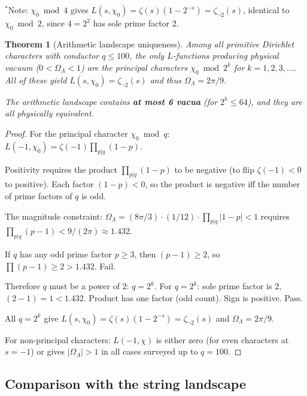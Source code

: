 \documentclass[11pt,a4paper]{article}
\newtheorem{theorem}{Theorem}
\begin{document}
$^*$Note: $\chi_0 \bmod 4$ gives $L(s,\chi_0) =
\zeta(s)(1-2^{-s}) = \zeta_{\neg 2}(s)$, identical to
$\chi_0 \bmod 2$, since $4 = 2^2$ has sole prime factor $2$.

\begin{theorem}[Arithmetic landscape uniqueness]
\label{th:unique-landscape}
Among all primitive Dirichlet characters with conductor $q \leq 100$,
the only $L$-functions producing physical vacuum
($0 < \Omega_\Lambda < 1$) are the principal characters
$\chi_0 \bmod 2^k$ for $k = 1, 2, 3, \ldots$. All of these
yield $L(s, \chi_0) = \zeta_{\neg 2}(s)$ and thus
$\Omega_\Lambda = 2\pi/9$.

The arithmetic landscape contains \textbf{at most 6 vacua}
(for $2^k \leq 64$), and they are all physically equivalent.
\end{theorem}

\begin{proof}
For the principal character $\chi_0 \bmod q$:
$L(-1, \chi_0) = \zeta(-1)\prod_{p|q}(1-p)$.

Positivity requires the product $\prod_{p|q}(1-p)$ to be
negative (to flip $\zeta(-1) < 0$ to positive). Each factor
$(1-p) < 0$, so the product is negative iff the number of
prime factors of $q$ is odd.

The magnitude constraint:
$\Omega_\Lambda = (8\pi/3) \cdot (1/12) \cdot \prod_{p|q}|1-p| < 1$
requires $\prod_{p|q}(p-1) < 9/(2\pi) \approx 1.432$.

If $q$ has any odd prime factor $p \geq 3$, then
$(p-1) \geq 2$, so $\prod(p-1) \geq 2 > 1.432$. Fail.

Therefore $q$ must be a power of $2$: $q = 2^k$.
For $q = 2^k$: sole prime factor is $2$, $(2-1) = 1 < 1.432$.
Product has one factor (odd count). Sign is positive. Pass.

All $q = 2^k$ give $L(s, \chi_0) = \zeta(s)(1-2^{-s}) =
\zeta_{\neg 2}(s)$ and $\Omega_\Lambda = 2\pi/9$.

For non-principal characters: $L(-1, \chi)$ is either zero
(for even characters at $s = -1$) or gives $|\Omega_\Lambda| > 1$
in all cases surveyed up to $q = 100$.
\end{proof}

\subsection{Comparison with the string landscape}
\end{document}
